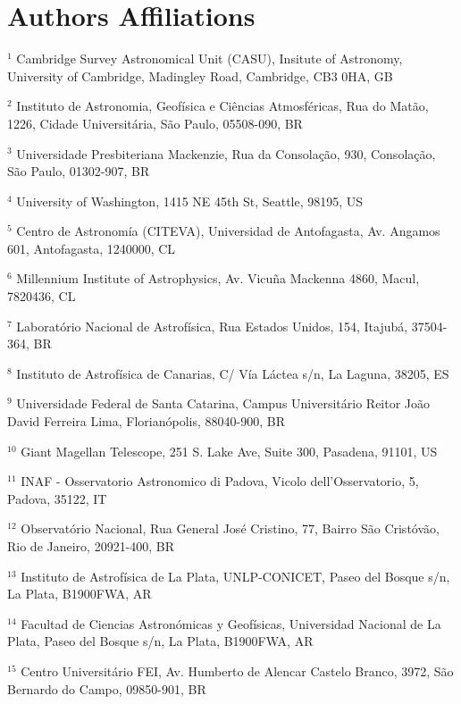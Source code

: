 \section{Authors Affiliations}\label{ap:affiliations}

\noindent
$^{1}$ Cambridge Survey Astronomical Unit (CASU), Insitute of Astronomy, University of Cambridge, Madingley Road, Cambridge, CB3 0HA, GB

\noindent
$^{2}$ Instituto de Astronomia, Geofísica e Ciências Atmosféricas, Rua do Matão, 1226, Cidade Universitária, São Paulo, 05508-090, BR

\noindent
$^{3}$ Universidade Presbiteriana Mackenzie, Rua da Consolação, 930, Consolação, São Paulo, 01302-907, BR

\noindent
$^{4}$ University of Washington, 1415 NE 45th St, Seattle, 98195, US

\noindent
$^{5}$ Centro de Astronomía (CITEVA), Universidad de Antofagasta, Av. Angamos 601, Antofagasta, 1240000, CL

\noindent
$^{6}$ Millennium Institute of Astrophysics, Av. Vicuña Mackenna 4860, Macul, 7820436, CL

\noindent
$^{7}$ Laboratório Nacional de Astrofísica, Rua Estados Unidos, 154, Itajubá, 37504-364, BR

\noindent
$^{8}$ Instituto de Astrofísica de Canarias, C/ Vía Láctea s/n, La Laguna, 38205, ES

\noindent
$^{9}$ Universidade Federal de Santa Catarina, Campus Universitário Reitor João David Ferreira Lima, Florianópolis, 88040-900, BR

\noindent
$^{10}$ Giant Magellan Telescope, 251 S. Lake Ave, Suite 300, Pasadena, 91101, US

\noindent
$^{11}$ INAF - Osservatorio Astronomico di Padova, Vicolo dell'Osservatorio, 5, Padova, 35122, IT

\noindent
$^{12}$ Observatório Nacional, Rua General José Cristino, 77, Bairro São Cristóvão, Rio de Janeiro, 20921-400, BR

\noindent
$^{13}$ Instituto de Astrofísica de La Plata, UNLP-CONICET, Paseo del Bosque s/n, La Plata, B1900FWA, AR

\noindent
$^{14}$ Facultad de Ciencias Astronómicas y Geofísicas, Universidad Nacional de La Plata, Paseo del Bosque s/n, La Plata, B1900FWA, AR

\noindent
$^{15}$ Centro Universitário FEI, Av. Humberto de Alencar Castelo Branco, 3972, São Bernardo do Campo, 09850-901, BR

